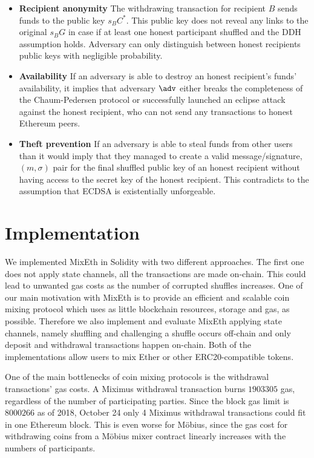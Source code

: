 \documentclass[a4paper]{article}
\theoremstyle{definition}
\begin{document}
\begin{itemize}
\item \textbf{Recipient anonymity}
The withdrawing transaction for recipient $B$ sends funds to the public key $s_{B}C^{*}$. This public key does not reveal any links to the original $s_{B}G$ in case if at least one honest participant shuffled and the DDH assumption holds. Adversary can only distinguish between honest recipients public keys with negligible probability.
\item \textbf{Availability}
If an adversary is able to destroy an honest recipient's funds' availability, it implies that adversary $\adv$ either breaks the completeness of the Chaum-Pedersen protocol or successfully launched an eclipse attack against the honest recipient, who can not send any transactions to honest Ethereum peers.
\item \textbf{Theft prevention} 
If an adversary is able to steal funds from other users than it would imply that they managed to create a valid message/signature, $(m,\sigma)$ pair for the final shuffled public key of an honest recipient without having access to the secret key of the honest recipient. This contradicts to the assumption that ECDSA is existentially unforgeable. 
\end{itemize}
\section{Implementation}

We implemented MixEth in Solidity with two different approaches. The first one does not apply state channels, all the transactions are made on-chain. This could lead to unwanted gas costs as the number of corrupted shuffles increases. One of our main motivation with MixEth is to provide an efficient and scalable coin mixing protocol which uses as little blockchain resources, storage and gas, as possible. Therefore we also implement and evaluate MixEth applying state channels, namely shuffling and challenging a shuffle occurs off-chain and only deposit and withdrawal transactions happen on-chain.
Both of the implementations allow users to mix Ether or other ERC20-compatible tokens.

One of the main bottlenecks of coin mixing protocols is the withdrawal transactions' gas costs. A Miximus withdrawal transaction burns $\num[group-separator={,}]{1903305}$ gas, regardless of the number of participating parties. Since the block gas limit is $\num[group-separator={,}]{8000266}$ as of 2018, October 24 only 4 Miximus withdrawal transactions could fit in one Ethereum block. This is even worse for Möbius, since the gas cost for withdrawing coins from a Möbius mixer contract linearly increases with the numbers of participants.
\end{document}
